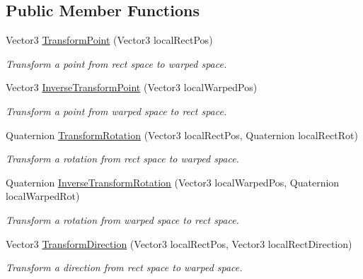 \subsection*{Public Member Functions}
\begin{DoxyCompactItemize}
\item 
Vector3 \mbox{\hyperlink{class_leap_1_1_unity_1_1_space_1_1_leap_spherical_space_1_1_transformer_a6ff15b9de7a7ca000bb2a565642a815e}{Transform\+Point}} (Vector3 local\+Rect\+Pos)
\begin{DoxyCompactList}\small\item\em Transform a point from rect space to warped space. \end{DoxyCompactList}\item 
Vector3 \mbox{\hyperlink{class_leap_1_1_unity_1_1_space_1_1_leap_spherical_space_1_1_transformer_acd09436f553794da5536559b5c3bfcab}{Inverse\+Transform\+Point}} (Vector3 local\+Warped\+Pos)
\begin{DoxyCompactList}\small\item\em Transform a point from warped space to rect space. \end{DoxyCompactList}\item 
Quaternion \mbox{\hyperlink{class_leap_1_1_unity_1_1_space_1_1_leap_spherical_space_1_1_transformer_a389407a7ecb746326153af8c11238250}{Transform\+Rotation}} (Vector3 local\+Rect\+Pos, Quaternion local\+Rect\+Rot)
\begin{DoxyCompactList}\small\item\em Transform a rotation from rect space to warped space. \end{DoxyCompactList}\item 
Quaternion \mbox{\hyperlink{class_leap_1_1_unity_1_1_space_1_1_leap_spherical_space_1_1_transformer_a00568c8a27881e7d49f850eec0ba562e}{Inverse\+Transform\+Rotation}} (Vector3 local\+Warped\+Pos, Quaternion local\+Warped\+Rot)
\begin{DoxyCompactList}\small\item\em Transform a rotation from warped space to rect space. \end{DoxyCompactList}\item 
Vector3 \mbox{\hyperlink{class_leap_1_1_unity_1_1_space_1_1_leap_spherical_space_1_1_transformer_a959b6b39a26640ddbd4bcda77deefde5}{Transform\+Direction}} (Vector3 local\+Rect\+Pos, Vector3 local\+Rect\+Direction)
\begin{DoxyCompactList}\small\item\em Transform a direction from rect space to warped space. \end{DoxyCompactList}\item 

\end{DoxyCompactItemize}
